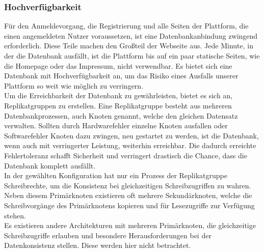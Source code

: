 \subsubsection{Hochverfügbarkeit}
Für den Anmeldevorgang, die Registrierung und alle Seiten der Plattform, die einen angemeldeten Nutzer voraussetzen, ist eine Datenbankanbindung zwingend erforderlich.
Diese Teile machen den Großteil der Webseite aus.
Jede Minute, in der die Datenbank ausfällt, ist die Plattform bis auf ein paar statische Seiten, wie die Homepage oder das Impressum, nicht verwendbar.
Es bietet sich eine Datenbank mit Hochverfügbarkeit an, um das Risiko eines Ausfalls unserer Plattform so weit wie möglich zu verringern.\\
Um die Erreichbarkeit der Datenbank zu gewährleisten, bietet es sich an, Replikatgruppen zu erstellen.
Eine Replikatgruppe besteht aus mehreren Datenbankprozessen, auch Knoten genannt, welche den gleichen Datensatz verwalten. %
Sollten durch Hardwarefehler einzelne Knoten ausfallen oder Softwarefehler Knoten dazu zwingen, neu gestartet zu werden, ist die Datenbank, wenn auch mit verringerter Leistung, weiterhin erreichbar.
Die dadurch erreichte Fehlertoleranz schafft Sicherheit und verringert drastisch die Chance, dass die Datenbank komplett ausfällt.\\
In der gewählten Konfiguration hat nur ein Prozess der Replikatgruppe Schreibrechte, um die Konsistenz bei gleichzeitigen Schreibzugriffen zu wahren.
Neben diesem Primärknoten existieren oft mehrere Sekundärknoten, welche die Schreibvorgänge des Primärknotens kopieren und für Lesezugriffe zur Verfügung stehen.\\
Es existieren andere Architekturen mit mehreren Primärknoten, die gleichzeitige Schreibzugriffe erlauben und besondere Herausforderungen bei der Datenkonsistenz stellen.
Diese werden hier nicht betrachtet.

